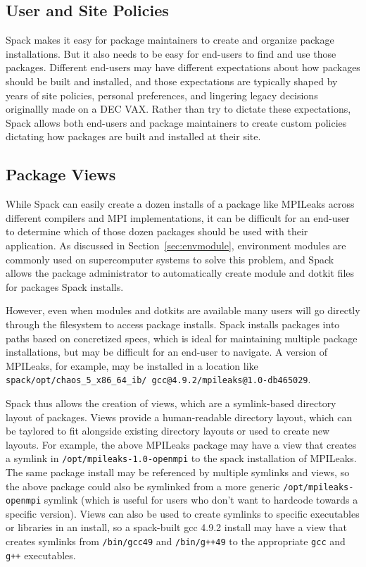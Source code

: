 
\subsection{User and Site Policies}
\label{sec:usecase-policy}

Spack makes it easy for package maintainers to create and organize package installations.  But it also needs to be easy for end-users to find and use those packages.  Different end-users may have different expectations about how packages should be built and installed, and those expectations are typically shaped by years of site policies, personal preferences, and lingering legacy decisions originallly made on a DEC VAX.  Rather than try to dictate these expectations, Spack allows both end-users and package maintainers to create custom policies dictating how packages are built and installed at their site.

\subsection{Package Views}
\label{sec:package-views}

While Spack can easily create a dozen installs of a package like MPILeaks across different compilers and MPI implementations, it can be difficult for an end-user to determine which of those dozen packages should be used with their application.  As discussed in Section~\ref{sec:envmodule}, environment modules are commonly used on supercomputer systems to solve this problem, and Spack allows the package administrator to automatically create module and dotkit files for packages Spack installs.

However, even when modules and dotkits are available many users will go directly through the filesystem to access package installs.  Spack installs packages into paths based on concretized specs, which is ideal for maintaining multiple package installations, but may be difficult for an end-user to navigate.  A version of MPILeaks, for example, may be installed in a location like {\tt spack/opt/chaos\_5\_x86\_64\_ib/ gcc@4.9.2/mpileaks@1.0-db465029}.

Spack thus allows the creation of views, which are a symlink-based directory layout of packages.  Views provide a human-readable directory layout, which can be taylored to fit alongside existing directory layouts or used to create new layouts.  For example, the above MPILeaks package may have a view that creates a symlink in {\tt /opt/mpileaks-1.0-openmpi} to the spack installation of MPILeaks.  The same package install may be referenced by multiple symlinks and views, so the above package could also be symlinked from a more generic {\tt /opt/mpileaks-openmpi} symlink (which is useful for users who don't want to hardcode towards a specific version).  Views can also be used to create symlinks to specific executables or libraries in an install, so a spack-built gcc 4.9.2 install may have a view that creates symlinks from {\tt /bin/gcc49} and {\tt /bin/g++49} to the appropriate {\tt gcc} and {\tt g++} executables.

